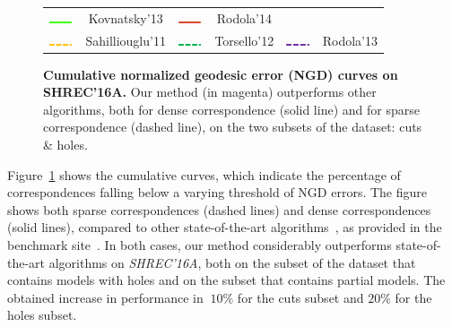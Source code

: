 \begin{figure}[h!]
\begin{tabular}{|cccccc|}
	\includegraphics[width=0.7cm]{figures/greenline.png} & \small{Kovnatsky'13\cite{kovnatsky2013coupled}} &
	\includegraphics[width=0.7cm]{figures/Dark_red_line.png} & \small{Rodola'14\cite{Rodola:2014:DNS:2679600.2679987}} \\
	\includegraphics[width=0.7cm]{figures/dashed_mustard.png} & \small{Sahilliouglu'11\cite{sahillioglu2011coarse}} &
	\includegraphics[width=0.7cm]{figures/dashed_green.png} & \small{Torsello'12\cite{Torsello:2012:GAD:2354409.2354702}} &
	\includegraphics[width=0.7cm]{figures/dashedpurple.png} & \small{Rodola'13\cite{rodola2013elastic}}\\
	\hline
\end{tabular}
	\caption{{\textbf{Cumulative normalized geodesic error (NGD) curves on SHREC'16A.}}
		Our method (in magenta) outperforms other algorithms, both for dense correspondence (solid line) and for sparse correspondence (dashed line), on the two subsets of the dataset: cuts \& holes.}
	\label{fig:Shrec16Cumulative}
\end{figure}
Figure~\ref{fig:Shrec16Cumulative} shows the cumulative curves, which indicate the percentage of correspondences falling below a varying threshold of NGD errors.
The figure shows both sparse correspondences (dashed lines) and dense correspondences (solid lines), compared to other state-of-the-art algorithms~\cite{kovnatsky2013coupled,litany2017fully,rodola2013elastic,Rodola:2014:DNS:2679600.2679987,rodola2017partial,sahillioglu2011coarse,Torsello:2012:GAD:2354409.2354702},
as provided in the benchmark site~\cite{cosmo2016shrec}. 
In both cases, our method considerably outperforms state-of-the-art algorithms on {\em SHREC'16A}, both on the subset of the dataset that contains models with holes and on the subset that contains partial models.
The obtained increase in performance in $~10\%$ for the cuts subset and $20\%$ for the holes subset.
